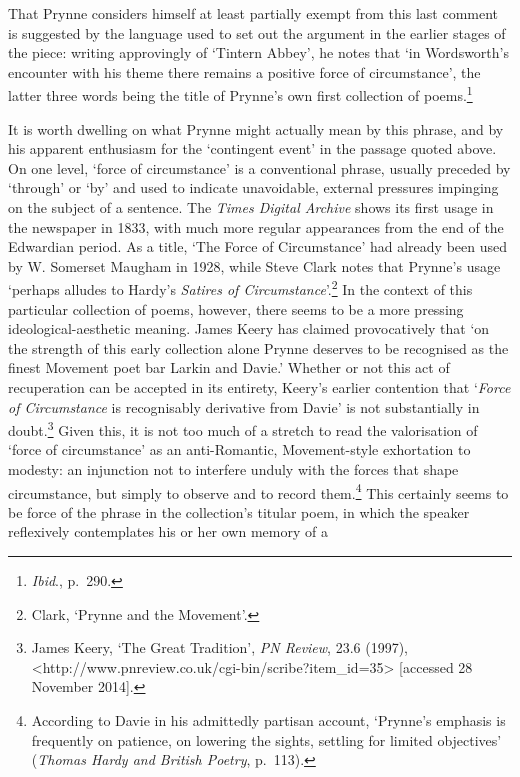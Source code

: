 \documentclass[]{article}
\begin{document}
\noindent That Prynne considers himself at least partially exempt from
this last comment is suggested by the language used to set out the
argument in the earlier stages of the piece: writing approvingly of
‘Tintern Abbey’, he notes that ‘in Wordsworth’s encounter with his theme
there remains a positive force of circumstance’, the latter three words
being the title of Prynne’s own first collection of poems.\footnote{\emph{Ibid}.,
  p.~290.}

It is worth dwelling on what Prynne might actually mean by this phrase,
and by his apparent enthusiasm for the ‘contingent event’ in the passage
quoted above. On one level, ‘force of circumstance’ is a conventional
phrase, usually preceded by ‘through’ or ‘by’ and used to indicate
unavoidable, external pressures impinging on the subject of a sentence.
The \emph{Times Digital Archive} shows its first usage in the newspaper
in 1833, with much more regular appearances from the end of the
Edwardian period. As a title, ‘The Force of Circumstance’ had already
been used by W. Somerset Maugham in 1928, while Steve Clark notes that
Prynne’s usage ‘perhaps alludes to Hardy’s \emph{Satires of
Circumstance}’.\footnote{Clark, ‘Prynne and the Movement’.} In the
context of this particular collection of poems, however, there seems to
be a more pressing ideological-aesthetic meaning. James Keery has
claimed provocatively that ‘on the strength of this early collection
alone Prynne deserves to be recognised as the finest Movement poet bar
Larkin and Davie.’ Whether or not this act of recuperation can be
accepted in its entirety, Keery’s earlier contention that ‘\emph{Force
of Circumstance} is recognisably derivative from Davie’ is not
substantially in doubt.\footnote{James Keery, ‘The Great Tradition’,
  \emph{PN Review}, 23.6 (1997),
  \textless{}http://www.pnreview.co.uk\slash cgi-bin\slash scribe?item\_id=35\textgreater{}
  {[}accessed 28 November 2014{]}.} Given this, it is not too much of a
stretch to read the valorisation of ‘force of circumstance’ as an
anti-Romantic, Movement-style exhortation to modesty: an injunction not
to interfere unduly with the forces that shape circumstance, but simply
to observe and to record them.\footnote{According to Davie in his
  admittedly partisan account, ‘Prynne’s emphasis is frequently on
  patience, on lowering the sights, settling for limited objectives’
  (\emph{Thomas Hardy and British Poetry}, p.~113).} This certainly
seems to be force of the phrase in the collection’s titular poem, in
which the speaker reflexively contemplates his or her own memory of a
\end{document}
